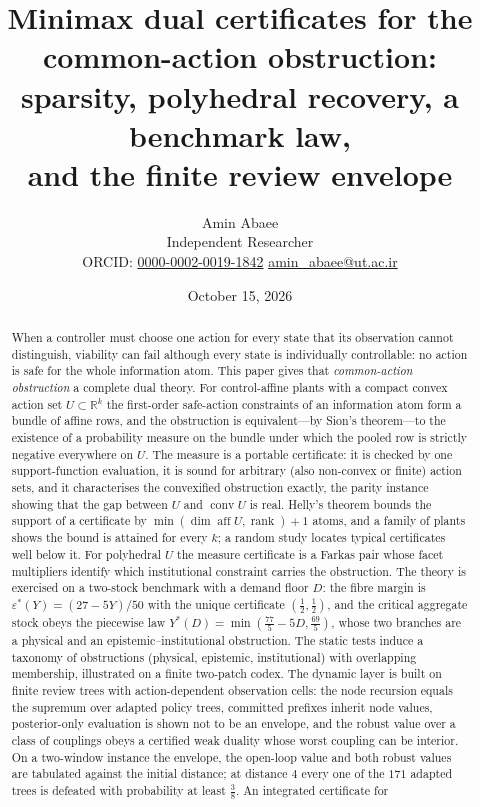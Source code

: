 \documentclass[11pt,a4paper]{article}
\theoremstyle{plain}
\theoremstyle{definition}
\theoremstyle{remark}
\newcommand{\R}{\mathbb{R}}
\newcommand{\conv}{\operatorname{conv}}
\newcommand{\aff}{\operatorname{aff}}
\newcommand{\rank}{\operatorname{rank}}
\newcommand{\tfr}[2]{\tfrac{#1}{#2}}
\begin{document}
\title{\textbf{Minimax dual certificates for the common-action obstruction:\\ sparsity, polyhedral recovery, a benchmark law,\\ and the finite review envelope}}
\author{Amin Abaee\\[0.3em]
{\small Independent Researcher}\\[0.2em]
{\small ORCID: \href{https://orcid.org/0000-0002-0019-1842}{0000-0002-0019-1842}\quad
\href{mailto:amin_abaee@ut.ac.ir}{amin\_abaee@ut.ac.ir}}}
\date{October 15, 2026}
\maketitle

\begin{abstract}
\noindent
When a controller must choose one action for every state that its observation cannot distinguish, viability can fail although every state is individually controllable: no action is safe for the whole information atom. This paper gives that \emph{common-action obstruction} a complete dual theory. For control-affine plants with a compact convex action set $U\subset\R^k$ the first-order safe-action constraints of an information atom form a bundle of affine rows, and the obstruction is equivalent---by Sion's theorem---to the existence of a probability measure on the bundle under which the pooled row is strictly negative everywhere on $U$. The measure is a portable certificate: it is checked by one support-function evaluation, it is sound for arbitrary (also non-convex or finite) action sets, and it characterises the convexified obstruction exactly, the parity instance showing that the gap between $U$ and $\conv U$ is real. Helly's theorem bounds the support of a certificate by $\min(\dim\aff U,\rank)+1$ atoms, and a family of plants shows the bound is attained for every $k$; a random study locates typical certificates well below it. For polyhedral $U$ the measure certificate is a Farkas pair whose facet multipliers identify which institutional constraint carries the obstruction. The theory is exercised on a two-stock benchmark with a demand floor $D$: the fibre margin is $\varepsilon^\ast(Y)=(27-5Y)/50$ with the unique certificate $(\tfr12,\tfr12)$, and the critical aggregate stock obeys the piecewise law $Y^\ast(D)=\min(\tfr{77}{5}-5D,\tfr{69}{5})$, whose two branches are a physical and an epistemic--institutional obstruction. The static tests induce a taxonomy of obstructions (physical, epistemic, institutional) with overlapping membership, illustrated on a finite two-patch codex. The dynamic layer is built on finite review trees with action-dependent observation cells: the node recursion equals the supremum over adapted policy trees, committed prefixes inherit node values, posterior-only evaluation is shown not to be an envelope, and the robust value over a class of couplings obeys a certified weak duality whose worst coupling can be interior. On a two-window instance the envelope, the open-loop value and both robust values are tabulated against the initial distance; at distance $4$ every one of the $171$ adapted trees is defeated with probability at least $\tfr38$. An integrated certificate for 
\end{abstract}
\end{document}
